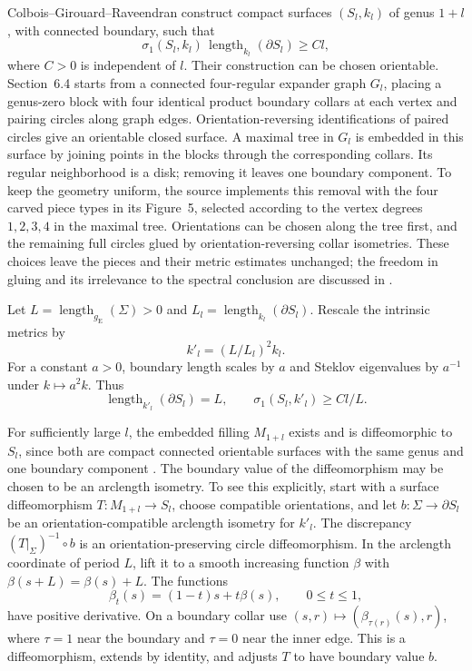 \documentclass[11pt]{article}
\theoremstyle{remark}
\begin{document}
Colbois--Girouard--Raveendran \cite[Theorem~7]{CGR} construct compact
surfaces $(S_l,k_l)$ of genus $1+l$, with connected boundary, such that
\begin{equation}\label{eq:surface-source}
 \sigma_1(S_l,k_l)\,\operatorname{length}_{k_l}(\partial S_l)
       \geq Cl,
\end{equation}
where $C>0$ is independent of $l$. Their construction can be chosen
orientable. Section~6.4 starts from a connected four-regular expander
graph $G_l$, placing a genus-zero block with four identical product
boundary collars at each vertex and pairing circles along graph edges.
Orientation-reversing identifications of paired circles give an
orientable closed surface. A maximal tree in $G_l$ is embedded in this
surface by joining points in the blocks through the corresponding
collars. Its regular neighborhood is a disk; removing it leaves one
boundary component. To keep the geometry uniform, the source implements
this removal with the four carved piece types in its Figure~5, selected
according to the vertex degrees $1,2,3,4$ in the maximal tree.
Orientations can be chosen along
the tree first, and the remaining full circles glued by
orientation-reversing collar isometries. These choices leave the pieces
and their metric estimates unchanged; the freedom in gluing and its
irrelevance to the spectral conclusion are discussed in
\cite[Remark~37]{CGR}.

Let $L=\operatorname{length}_{g_{\mathrm E}}(\Sigma)>0$ and
$L_l=\operatorname{length}_{k_l}(\partial S_l)$. Rescale the intrinsic
metrics by
\[
 k'_l=(L/L_l)^2k_l.
\]
For a constant $a>0$, boundary length scales by $a$ and Steklov
eigenvalues by $a^{-1}$ under $k\mapsto a^2k$. Thus
\begin{equation}\label{eq:surface-scaled}
 \operatorname{length}_{k'_l}(\partial S_l)=L,
 \qquad \sigma_1(S_l,k'_l)\geq Cl/L.
\end{equation}

For sufficiently large $l$, the embedded filling $M_{1+l}$ exists and
is diffeomorphic to $S_l$, since both are compact connected orientable
surfaces with the same genus and one boundary component
\cite[Theorem~9.3.7]{Hirsch}. The boundary value of the diffeomorphism
may be chosen to be an arclength isometry. To see this explicitly,
start with a surface diffeomorphism $T:M_{1+l}\to S_l$, choose compatible
orientations, and let $b:\Sigma\to\partial S_l$ be an orientation-compatible
arclength isometry for $k'_l$. The discrepancy
$(T|_\Sigma)^{-1}\circ b$ is an orientation-preserving circle
diffeomorphism. In the arclength coordinate of period $L$, lift it to
a smooth increasing function $\beta$ with
$\beta(s+L)=\beta(s)+L$. The functions
\[
 \beta_t(s)=(1-t)s+t\beta(s),\qquad 0\leq t\leq1,
\]
have positive derivative. On a boundary collar use
$(s,r)\mapsto(\beta_{\tau(r)}(s),r)$, where $\tau=1$ near the boundary
and $\tau=0$ near the inner edge. This is a diffeomorphism, extends by
identity, and adjusts $T$ to have boundary value $b$.
\end{document}
